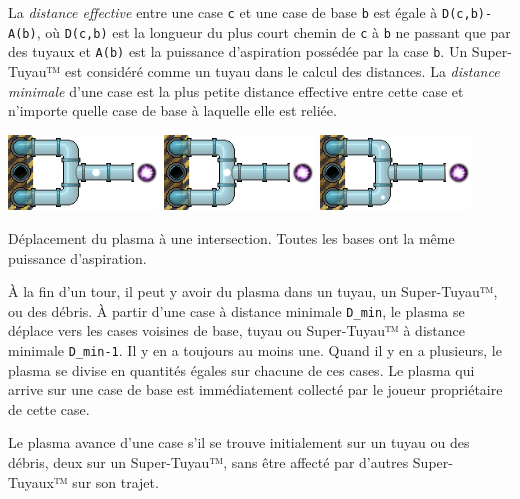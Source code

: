 La \emph{distance effective} entre une case \texttt{c} et une case de
base \texttt{b} est égale à \texttt{D(c,b)-A(b)}, où \texttt{D(c,b)} est
la longueur du plus court chemin de \texttt{c} à \texttt{b} ne passant
que par des tuyaux et \texttt{A(b)} est la puissance d'aspiration
possédée par la case \texttt{b}. Un Super-Tuyau™ est considéré comme un
tuyau dans le calcul des distances. La \emph{distance minimale} d'une
case est la plus petite distance effective entre cette case et n'importe
quelle case de base à laquelle elle est reliée.

\noindent\includegraphics[width=0.3\textwidth]{asset/split_t0.png}\hfill
\includegraphics[width=0.3\textwidth]{asset/split_t1.png}\hfill
\includegraphics[width=0.3\textwidth]{asset/split_t2.png}

Déplacement du plasma à une intersection. Toutes les bases ont la même
puissance d'aspiration.

À la fin d'un tour, il peut y avoir du plasma dans un tuyau, un
Super-Tuyau™, ou des débris. À partir d'une case à distance minimale
\texttt{D\_min}, le plasma se déplace vers les cases voisines de base,
tuyau ou Super-Tuyau™ à distance minimale \texttt{D\_min-1}. Il y en a
toujours au moins une. Quand il y en a plusieurs, le plasma se divise en
quantités égales sur chacune de ces cases. Le plasma qui arrive sur une
case de base est immédiatement collecté par le joueur propriétaire de
cette case.

Le plasma avance d'une case s'il se trouve initialement sur un tuyau ou
des débris, deux sur un Super-Tuyau™, sans être affecté par d'autres
Super-Tuyaux™ sur son trajet.

